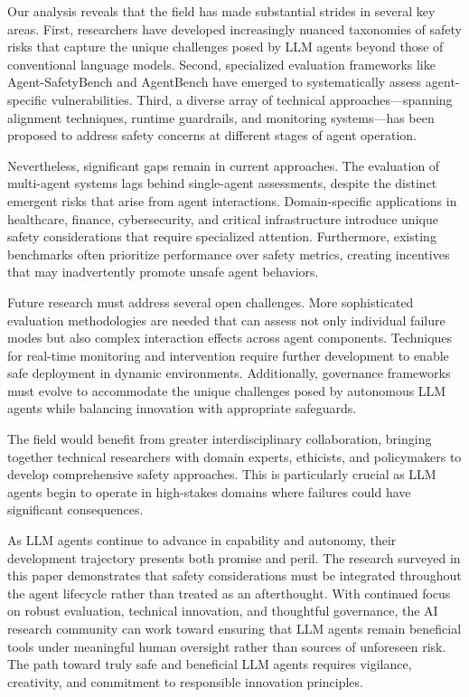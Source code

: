\documentclass[conference]{IEEEtran}
\begin{document}
Our analysis reveals that the field has made substantial strides in several key areas. First, researchers have developed increasingly nuanced taxonomies of safety risks that capture the unique challenges posed by LLM agents beyond those of conventional language models. Second, specialized evaluation frameworks like Agent-SafetyBench and AgentBench have emerged to systematically assess agent-specific vulnerabilities. Third, a diverse array of technical approaches—spanning alignment techniques, runtime guardrails, and monitoring systems—has been proposed to address safety concerns at different stages of agent operation.

Nevertheless, significant gaps remain in current approaches. The evaluation of multi-agent systems lags behind single-agent assessments, despite the distinct emergent risks that arise from agent interactions. Domain-specific applications in healthcare, finance, cybersecurity, and critical infrastructure introduce unique safety considerations that require specialized attention. Furthermore, existing benchmarks often prioritize performance over safety metrics, creating incentives that may inadvertently promote unsafe agent behaviors.

Future research must address several open challenges. More sophisticated evaluation methodologies are needed that can assess not only individual failure modes but also complex interaction effects across agent components. Techniques for real-time monitoring and intervention require further development to enable safe deployment in dynamic environments. Additionally, governance frameworks must evolve to accommodate the unique challenges posed by autonomous LLM agents while balancing innovation with appropriate safeguards.

The field would benefit from greater interdisciplinary collaboration, bringing together technical researchers with domain experts, ethicists, and policymakers to develop comprehensive safety approaches. This is particularly crucial as LLM agents begin to operate in high-stakes domains where failures could have significant consequences.

As LLM agents continue to advance in capability and autonomy, their development trajectory presents both promise and peril. The research surveyed in this paper demonstrates that safety considerations must be integrated throughout the agent lifecycle rather than treated as an afterthought. With continued focus on robust evaluation, technical innovation, and thoughtful governance, the AI research community can work toward ensuring that LLM agents remain beneficial tools under meaningful human oversight rather than sources of unforeseen risk. The path toward truly safe and beneficial LLM agents requires vigilance, creativity, and commitment to responsible innovation principles.



\end{document}
